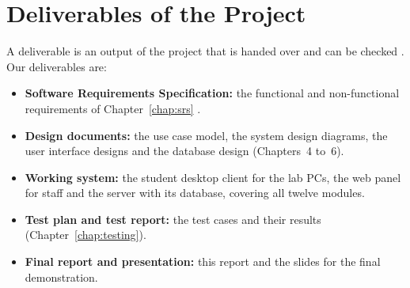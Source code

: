 \section{Deliverables of the Project}

A deliverable is an output of the project that is handed over and can be checked \cite{del1}. Our deliverables are:
\begin{itemize}
    \item \textbf{Software Requirements Specification:} the functional and non-functional requirements of Chapter~\ref{chap:srs} \cite{srs1}.
    \item \textbf{Design documents:} the use case model, the system design diagrams, the user interface designs and the database design (Chapters~4 to~6).
    \item \textbf{Working system:} the student desktop client for the lab PCs, the web panel for staff and the server with its database, covering all twelve modules.
    \item \textbf{Test plan and test report:} the test cases and their results (Chapter~\ref{chap:testing}).
    \item \textbf{Final report and presentation:} this report and the slides for the final demonstration.
\end{itemize}
